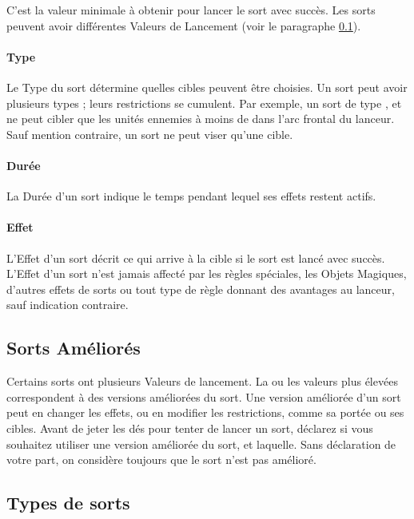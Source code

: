 C'est la valeur minimale à obtenir pour lancer le sort avec succès. Les sorts peuvent avoir différentes Valeurs de Lancement (voir le paragraphe \ref{boosted_spells}).

\paragraph{Type}

Le Type du sort détermine quelles cibles peuvent être choisies. Un sort peut avoir plusieurs types ; leurs restrictions se cumulent. Par exemple, un sort de type , \hex{} et \direct{} ne peut cibler que les unités ennemies à moins de  dans l'arc frontal du lanceur. Sauf mention contraire, un sort ne peut viser qu'une cible.

\paragraph{Durée}

La Durée d'un sort indique le temps pendant lequel ses effets restent actifs.

\paragraph{Effet}

L'Effet d'un sort décrit ce qui arrive à la cible si le sort est lancé avec succès. L'Effet d'un sort n'est jamais affecté par les règles spéciales, les Objets Magiques, d'autres effets de sorts ou tout type de règle donnant des avantages au lanceur, sauf indication contraire.

\subsection{Sorts Améliorés}
\label{boosted_spells}

Certains sorts ont plusieurs Valeurs de lancement. La ou les valeurs plus élevées correspondent à des versions améliorées du sort. Une version améliorée d'un sort peut en changer les effets, ou en modifier les restrictions, comme sa portée ou ses cibles. Avant de jeter les dés pour tenter de lancer un sort, déclarez si vous souhaitez utiliser une version améliorée du sort, et laquelle. Sans déclaration de votre part, on considère toujours que le sort n'est pas amélioré.

\newpage
\subsection{Types de sorts}
\label{spell_types}

